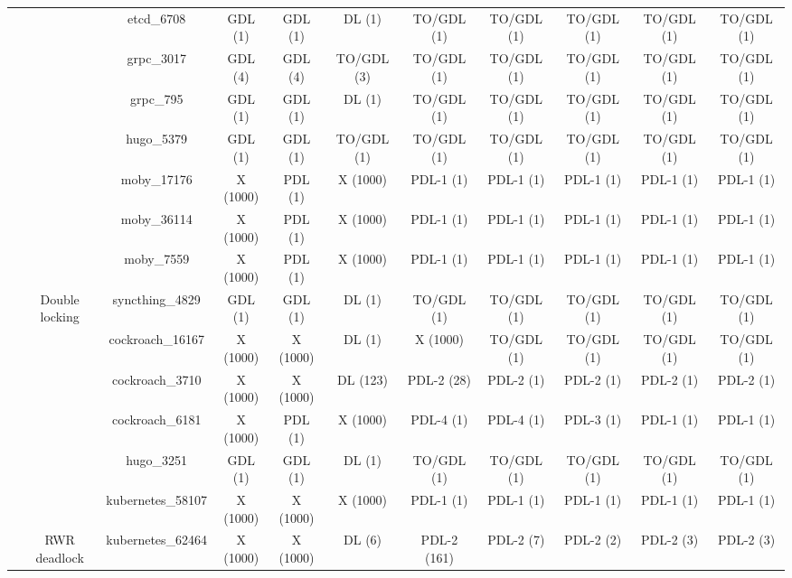 \begin{tabular}{|c|c|c|ccc|ccccc|}
 &  & etcd\_6708 & GDL (1) & GDL (1) & DL (1) & TO/GDL (1) & TO/GDL (1) & TO/GDL (1) & TO/GDL (1) & TO/GDL (1) \\ \cline{3-3}
 &  & grpc\_3017 & GDL (4) & GDL (4) & TO/GDL (3) & TO/GDL (1) & TO/GDL (1) & TO/GDL (1) & TO/GDL (1) & TO/GDL (1) \\ \cline{3-3}
 &  & grpc\_795 & GDL (1) & GDL (1) & DL (1) & TO/GDL (1) & TO/GDL (1) & TO/GDL (1) & TO/GDL (1) & TO/GDL (1) \\ \cline{3-3}
 &  & hugo\_5379 & GDL (1) & GDL (1) & TO/GDL (1) & TO/GDL (1) & TO/GDL (1) & TO/GDL (1) & TO/GDL (1) & TO/GDL (1) \\ \cline{3-3}
 &  & moby\_17176 & X (1000) & PDL (1) & X (1000) & PDL-1 (1) & PDL-1 (1) & PDL-1 (1) & PDL-1 (1) & PDL-1 (1) \\ \cline{3-3}
 &  & moby\_36114 & X (1000) & PDL (1) & X (1000) & PDL-1 (1) & PDL-1 (1) & PDL-1 (1) & PDL-1 (1) & PDL-1 (1) \\ \cline{3-3}
 &  & moby\_7559 & X (1000) & PDL (1) & X (1000) & PDL-1 (1) & PDL-1 (1) & PDL-1 (1) & PDL-1 (1) & PDL-1 (1) \\ \cline{3-3}
 & \multirow{-12}{*}{Double locking} & syncthing\_4829 & GDL (1) & GDL (1) & DL (1) & TO/GDL (1) & TO/GDL (1) & TO/GDL (1) & TO/GDL (1) & TO/GDL (1) \\ \cline{2-11}
 &  & cockroach\_16167 & X (1000) & X (1000) & DL (1) & X (1000) & TO/GDL (1) & TO/GDL (1) & TO/GDL (1) & TO/GDL (1) \\ \cline{3-3}
 &  & cockroach\_3710 & X (1000) & X (1000) & DL (123) & \cellcolor[HTML]{EFEFEF}PDL-2 (28) & \cellcolor[HTML]{EFEFEF}PDL-2 (1) & \cellcolor[HTML]{EFEFEF}PDL-2 (1) & \cellcolor[HTML]{EFEFEF}PDL-2 (1) & \cellcolor[HTML]{EFEFEF}PDL-2 (1) \\ \cline{3-3}
 &  & cockroach\_6181 & X (1000) & PDL (1) & X (1000) & PDL-4 (1) & PDL-4 (1) & PDL-3 (1) & PDL-1 (1) & PDL-1 (1) \\ \cline{3-3}
 &  & hugo\_3251 & GDL (1) & GDL (1) & DL (1) & TO/GDL (1) & TO/GDL (1) & TO/GDL (1) & TO/GDL (1) & TO/GDL (1) \\ \cline{3-3}
 &  & kubernetes\_58107 & X (1000) & X (1000) & X (1000) & \cellcolor[HTML]{EFEFEF}PDL-1 (1) & \cellcolor[HTML]{EFEFEF}PDL-1 (1) & \cellcolor[HTML]{EFEFEF}PDL-1 (1) & \cellcolor[HTML]{EFEFEF}PDL-1 (1) & \cellcolor[HTML]{EFEFEF}PDL-1 (1) \\ \cline{3-3}
 & \multirow{-6}{*}{RWR deadlock} & kubernetes\_62464 & X (1000) & X (1000) & DL (6) & PDL-2 (161) & PDL-2 (7) & PDL-2 (2) & PDL-2 (3) & PDL-2 (3) \\ \cline{2-11}

\end{tabular}
